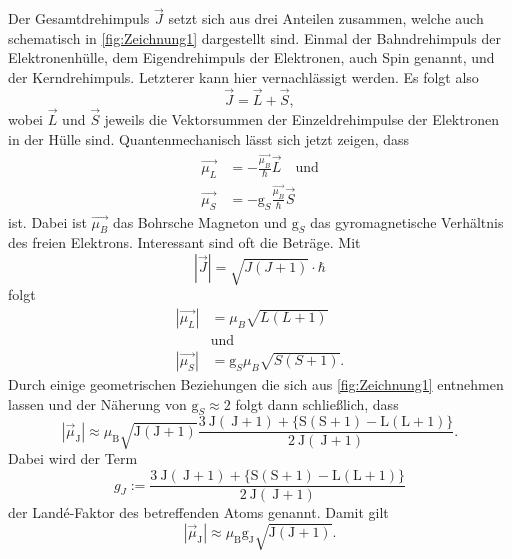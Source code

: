 Der Gesamtdrehimpuls $\vec{J}$ setzt sich aus drei Anteilen zusammen, welche auch schematisch in \autoref{fig:Zeichnung1} dargestellt sind.
Einmal der Bahndrehimpuls der Elektronenhülle, dem Eigendrehimpuls der Elektronen, auch Spin genannt, und der Kerndrehimpuls.
Letzterer kann hier vernachlässigt werden.
Es folgt also
\begin{equation}
    \vec{J} = \vec{L} + \vec{S},
\end{equation}
wobei $\vec{L}$ und $\vec{S}$ jeweils die Vektorsummen der Einzeldrehimpulse der Elektronen in der Hülle sind.
Quantenmechanisch lässt sich jetzt zeigen, dass
\begin{align}
    \vec{\mu_L} &= - \frac{\vec{\mu_B}}{\hbar} \vec{L} \quad \text{und} \\
    \vec{\mu_S} &= - \text{g}_S \frac{\vec{\mu_B}}{\hbar} \vec{S}
\end{align}
ist.
Dabei ist $\vec{\mu_B}$ das Bohrsche Magneton und $\text{g}_S$ das gyromagnetische Verhältnis des freien Elektrons.
Interessant sind oft die Beträge.
Mit
\begin{equation*}
    \left| \vec{J}\right| = \sqrt{J \left( J + 1 \right)} \cdot \hbar
\end{equation*}
folgt 
\begin{align}
    \left|\vec{\mu_L} \right| &= \mu_B \sqrt{L \left( L + 1 \right)} \\
    &\text{und} \nonumber \\
    \left|\vec{\mu_S} \right| &= \text{g}_S \mu_B \sqrt{S \left( S + 1 \right)}.
\end{align}
Durch einige geometrischen Beziehungen die sich aus \autoref{fig:Zeichnung1} entnehmen lassen und der Näherung von $\text{g}_S \approx 2$ folgt dann schließlich, dass
\begin{equation}
    \left|\vec{\mu}_{\mathrm{J}}\right| \approx \mu_{\mathrm{B}} \sqrt{\mathrm{J}(\mathrm{J}+1)} \frac{3 \mathrm{~J}(\mathrm{~J}+1)+\{\mathrm{S}(\mathrm{S}+1)-\mathrm{L}(\mathrm{L}+1)\}}{2 \mathrm{~J}(\mathrm{~J}+1)} .
\end{equation}
Dabei wird der Term
\begin{equation}
    g_{J}:=\frac{3 \mathrm{~J}(\mathrm{~J}+1)+\{\mathrm{S}(\mathrm{S}+1)-\mathrm{L}(\mathrm{L}+1)\}}{2 \mathrm{~J}(\mathrm{~J}+1)}
\end{equation}
der Landé-Faktor des betreffenden Atoms genannt. Damit gilt
\begin{equation}
    \left|\vec{\mu}_{\mathrm{J}}\right| \approx \mu_{\mathrm{B}} \mathrm{g}_{\mathrm{J}} \sqrt{\mathrm{J}(\mathrm{J}+1)}.
\end{equation}
